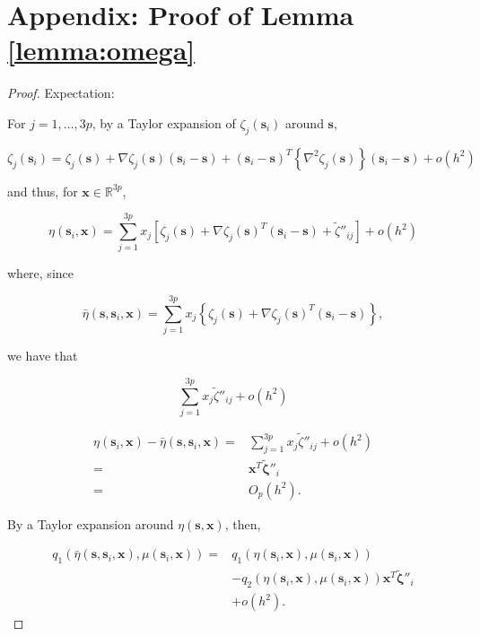 \documentclass[english]{article}\usepackage[]{graphicx}\usepackage[]{color}
\theoremstyle{plain}
\theoremstyle{plain}
\begin{document}
\section*{Appendix: Proof of Lemma \ref{lemma:omega}}
\begin{proof}
Expectation:

For $j=1,\dots,3p$, by a Taylor expansion of $\zeta_{j}\left(\bm{s}_{i}\right)$
around $\bm{s}$,

\[
\zeta_{j}\left(\bm{s}_{i}\right)=\zeta_{j}\left(\bm{s}\right)+\nabla\zeta_{j}\left(\bm{s}\right)\left(\bm{s}_{i}-\bm{s}\right)+\left(\bm{s}_{i}-\bm{s}\right)^{T}\left\{ \nabla^{2}\zeta_{j}\left(\bm{s}\right)\right\} \left(\bm{s}_{i}-\bm{s}\right)+o\left(h^{2}\right)
\]


and thus, for $\bm{x}\in\mathbb{R}^{3p}$, 

\[
\eta\left(\bm{s}_{i},\bm{x}\right)=\sum_{j=1}^{3p}x_{j}\left[\zeta_{j}\left(\bm{s}\right)+\nabla\zeta_{j}\left(\bm{s}\right)^{T}\left(\bm{s}_{i}-\bm{s}\right)+\tilde{\zeta}''_{ij}\right]+o\left(h^{2}\right)
\]


where, since 

\[
\bar{\eta}\left(\bm{s},\bm{s}_{i},\bm{x}\right)=\sum_{j=1}^{3p}x_{j}\left\{ \zeta_{j}\left(\bm{s}\right)+\nabla\zeta_{j}\left(\bm{s}\right)^{T}\left(\bm{s}_{i}-\bm{s}\right)\right\} ,
\]


we have that 

\[
\sum_{j=1}^{3p}x_{j}\tilde{\zeta}''_{ij}+o\left(h^{2}\right)
\]


\begin{align*}
\eta\left(\bm{s}_{i},\bm{x}\right)-\bar{\eta}\left(\bm{s},\bm{s}_{i},\bm{x}\right)= & \sum_{j=1}^{3p}x_{j}\tilde{\zeta}''_{ij}+o\left(h^{2}\right)\\
= & \bm{x}^{T}\tilde{\bm{\zeta}}''_{i}\\
= & O_{p}\left(h^{2}\right).
\end{align*}


By a Taylor expansion around $\eta\left(\bm{s},\bm{x}\right)$, then, 

\begin{align*}
q_{1}\left(\bar{\eta}\left(\bm{s},\bm{s}_{i},\bm{x}\right),\mu\left(\bm{s}_{i},\bm{x}\right)\right)= & q_{1}\left(\eta\left(\bm{s}_{i},\bm{x}\right),\mu\left(\bm{s}_{i},\bm{x}\right)\right)\\
 & -q_{2}\left(\eta\left(\bm{s}_{i},\bm{x}\right),\mu\left(\bm{s}_{i},\bm{x}\right)\right)\bm{x}^{T}\tilde{\bm{\zeta}}''_{i}\\
 & +o\left(h^{2}\right).
\end{align*}



\end{proof}
\end{document}
